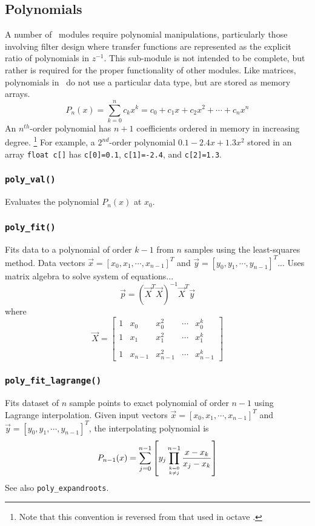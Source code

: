 \subsection{Polynomials}
A number of \liquid\ modules require polynomial manipulations, particularly
those involving filter design where transfer functions are represented as the
explicit ratio of polynomials in $z^{-1}$.
This sub-module is not intended to be complete, but rather is required for
the proper functionality of other modules.
Like matrices, polynomials in \liquid\ do not use a particular data type, but
are stored as memory arrays.
\[
    P_n(x) = \sum_{k=0}^{n}{c_k x^k}
           = c_0 + c_1 x + c_2 x^2 + \cdots + c_n x^n
\]
An $n^{th}$-order polynomial has $n+1$ coefficients ordered in memory in
increasing degree.%
\footnote{Note that this convention is reversed from that used in octave
\cite{octave:web}.}
For example, a $2^{nd}$-order polynomial $0.1 -2.4x + 1.3x^2$ stored in an
array {\tt float c[]} has
{\tt c[0]=0.1},
{\tt c[1]=-2.4}, and
{\tt c[2]=1.3}.

\subsubsection{{\tt poly\_val()}}
Evaluates the polynomial $P_n(x)$ at $x_0$.

\subsubsection{{\tt poly\_fit()}}
Fits data to a polynomial of order $k-1$ from $n$ samples using the
least-squares method.
Data vectors
$\vec{x}=[x_0,x_1,\cdots,x_{n-1}]^T$ and 
$\vec{y}=[y_0,y_1,\cdots,y_{n-1}]^T$...
Uses matrix algebra to solve system of equations...
\[
    \vec{p} = \left(\vec{X}^T\vec{X}\right)^{-1}\vec{X}^T\vec{y}
\]
where
\[
    \vec{X} = 
    \begin{bmatrix}
        1   & x_0       & x_0^2     & \cdots    & x_0^{k}     \\
        1   & x_1       & x_1^2     & \cdots    & x_1^{k}     \\
        \\
        1   & x_{n-1}   & x_{n-1}^2 & \cdots    & x_{n-1}^{k}
    \end{bmatrix}
\]


\subsubsection{{\tt poly\_fit\_lagrange()}}
Fits dataset of $n$ sample points to exact polynomial of order $n-1$ using
Lagrange interpolation.
Given input vectors
$\vec{x}=[x_0,x_1,\cdots,x_{n-1}]^T$ and 
$\vec{y}=[y_0,y_1,\cdots,y_{n-1}]^T$, the interpolating polynomial is
\[
    P_{n-1}(x) =
        \sum_{j=0}^{n-1} {
            \left[
            y_j
            \prod_{{k=0}\atop{k \ne j}}^{n-1} {
                \frac{x-x_k}{x_j-x_k}
            }
            \right]
        }
\]
See also {\tt poly\_expandroots}.

